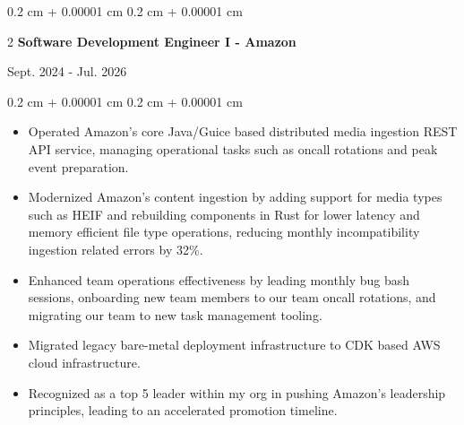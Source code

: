 \documentclass[10pt, letterpaper]{article}
\newenvironment{highlightsforbulletentries}{
    \begin{itemize}[
        topsep=0.10 cm,
        parsep=0.10 cm,
        partopsep=0pt,
        itemsep=0pt,
        leftmargin=10pt
    ]
}{
    \end{itemize}
} %
\newenvironment{onecolentry}{
    \begin{adjustwidth}{
        0.2 cm + 0.00001 cm
    }{
        0.2 cm + 0.00001 cm
    }
}{
    \end{adjustwidth}
} %
\newenvironment{twocolentry}[2][]{
    \onecolentry
    \def\secondColumn{#2}
    \setcolumnwidth{\fill, 4.5 cm}
    \begin{paracol}{2}
}{
    \switchcolumn \raggedleft \secondColumn
    \end{paracol}
    \endonecolentry
} %
\begin{document}
        \begin{twocolentry}{
            Sept. 2024 - Jul. 2026
        }{
            \textbf{Software Development Engineer I - Amazon}
        }
        \end{twocolentry}
        \vspace{0.1 cm}
        \begin{onecolentry}
            \begin{highlightsforbulletentries}
                \item Operated Amazon's core Java/Guice based distributed media ingestion REST API service, managing
                operational tasks such as oncall rotations and peak event preparation.
                \item Modernized Amazon's content ingestion by adding support for media types such as HEIF and
                rebuilding components in Rust for lower latency and memory efficient file type operations,
                reducing monthly incompatibility ingestion related errors by 32\%.
                \item Enhanced team operations effectiveness by leading monthly bug bash sessions, onboarding new team
                members to our team oncall rotations, and migrating our team to new task management tooling.
                \item Migrated legacy bare-metal deployment infrastructure to CDK based AWS cloud infrastructure.
                \item Recognized as a top 5 leader within my org in pushing Amazon's leadership principles, leading
                to an accelerated promotion timeline.
            \end{highlightsforbulletentries}
        \end{onecolentry}

        \vspace{0.2 cm}
\end{document}
